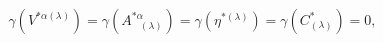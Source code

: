 \begin{equation}
\gamma \left( V^{*\alpha (\lambda )}\right) =\gamma \left( A_{\;\;\;(\lambda
)}^{*\alpha }\right) =\gamma \left( \eta ^{*(\lambda )}\right) =\gamma
\left( C_{(\lambda )}^{*}\right) =0,  \label{bf44}
\end{equation}

